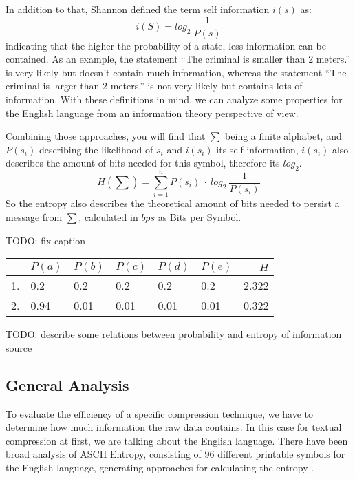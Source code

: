 \par{
In addition to that, Shannon defined the term self information $i(s)$ as:
\[
i(S) = log_{2} \: \frac{1}{P(s)}
\]
indicating that the higher the probability of a state, less information can be contained. As an example, the statement \enquote{The criminal is smaller than 2 meters.} is very likely but doesn't contain much information, whereas the statement \enquote{The criminal is larger than 2 meters.} is not very likely but contains lots of information. With these definitions in mind, we can analyze some properties for the English language from an information theory perspective of view.
}

\par{
Combining those approaches, you will find that $\sum$ being a finite alphabet, and $P(s_i)$ describing the likelihood of $s_i$ and $i(s_i)$ its self information, $i(s_i)$ also describes the amount of bits needed for this symbol, therefore its $log_2$.
\[
	H(\sum) = \sum_{i = 1}^{n} P(s_i) \: \cdot \: log_{2} \: \frac{1}{P(s_i) }
\]
So the entropy 	also describes the theoretical amount of bits needed to persist a message from $\sum$, calculated in $bps$ as Bits per Symbol.

TODO: fix caption

\begin{center}
\begin{tabular}[p]{l|l|l|l|l|l|r}
	
	& $P(a)$ & $P(b)$ & $P(c)$ & $P(d)$ & $P(e)$ & $H$ \\
	\hline
	1. & 0.2 & 0.2 & 0.2 & 0.2 & 0.2 & 2.322 \\
	2. & 0.94 & 0.01 & 0.01 & 0.01 & 0.01 & 0.322
	\label{tab:heisetabelle}
\end{tabular}
\end{center}
TODO: describe some relations between probability and entropy of information source
}
\subsection{General Analysis}
\par{
To evaluate the efficiency of a specific compression technique, we have to determine how much information the raw data contains. In this case for textual compression at first, we are talking about the English language. There have been broad analysis of ASCII Entropy, consisting of 96 different printable symbols for the English language, generating approaches for calculating the entropy \cite{entropy-fernau}.
}

